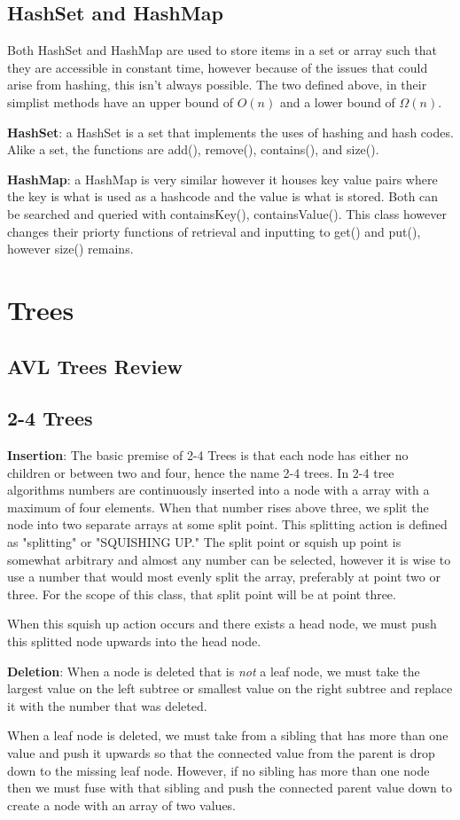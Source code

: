 \subsection{HashSet and HashMap}

Both HashSet and HashMap are used to store items in a set or array such that they are accessible in constant time, however because of the issues that could arise from hashing, this isn't always possible. The two defined above, in their simplist methods have an upper bound of $O(n)$ and a lower bound of $\Omega(n)$.
\par
\textbf{HashSet}: a HashSet is a set that implements the uses of hashing and hash codes. Alike a set, the functions are add(), remove(), contains(), and size().

\textbf{HashMap}: a HashMap is very similar however it houses key value pairs where the key is what is used as a hashcode and the value is what is stored. Both can be searched and queried with containsKey(), containsValue(). This class however changes their priorty functions of retrieval and inputting to get() and put(), however size() remains.

\section{Trees}
\subsection{AVL Trees Review}
\subsection{2-4 Trees}
\textbf{Insertion}:
The basic premise of 2-4 Trees is that each node has either no children or between two and four, hence the name 2-4 trees. In 2-4 tree algorithms numbers are continuously inserted into a node with a array with a maximum of four elements. When that number rises above three, we split the node into two separate arrays at some split point. This splitting action is defined as "splitting" or "SQUISHING UP." The split point or squish up point is somewhat arbitrary and almost any number can be selected, however it is wise to use a number that would most evenly split the array, preferably at point two or three. For the scope of this class, that split point will be at point three.\par
When this squish up action occurs and there exists a head node, we must push this splitted node upwards into the head node. \par
\textbf{Deletion}:
When a node is deleted that is \emph{not} a leaf node, we must take the largest value on the left subtree or smallest value on the right subtree and replace it with the number that was deleted. \par
When a leaf node is deleted, we must take from a sibling that has more than one value and push it upwards so that the connected value from the parent is drop down to the missing leaf node. However, if no sibling has more than one node then we must fuse with that sibling and push the connected parent value down to create a node with an array of two values.

